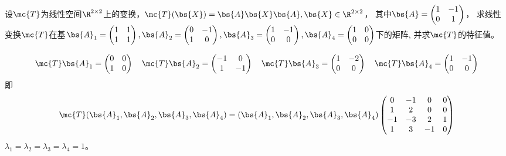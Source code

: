 \documentclass[12pt, a4paper, oneside, UTF8]{ctexbook}
\begin{document}
\begin{question}
    设$\mc{T}$为线性空间$\R^{2\times 2}$上的变换，$\mc{T}(\bs{X})=\bs{A}\bs{X}\bs{A},\bs{X} \in \R^{2\times 2}$，
    其中$\bs{A}=\begin{pmatrix}
        1&-1\\
        0&1
    \end{pmatrix}$，
    求线性变换$\mc{T}$在基$\bs{A}_1=\begin{pmatrix}
            1&1\\
            1&1
        \end{pmatrix},\bs{A}_2=\begin{pmatrix}
            0&-1\\
            1&0
        \end{pmatrix},\bs{A}_3=\begin{pmatrix}
            1&-1\\
            0&0
        \end{pmatrix},\bs{A}_4=\begin{pmatrix}
            1&0\\
            0&0
        \end{pmatrix}$下的矩阵,
        并求$\mc{T}$的特征值。
\end{question}

\begin{solution}
    \begin{align*}
        \mc{T}\bs{A}_1=\begin{pmatrix}
            0&0\\
            1&0
        \end{pmatrix} \quad
        \mc{T}\bs{A}_2=\begin{pmatrix}
            -1&0\\
            1&-1
        \end{pmatrix}\quad
        \mc{T}\bs{A}_3=\begin{pmatrix}
            1&-2\\
            0&0
        \end{pmatrix}\quad
        \mc{T}\bs{A}_4=\begin{pmatrix}
            1&-1\\
            0&0
        \end{pmatrix}
    \end{align*}
        即
        \begin{align*}
            \mc{T}(\bs{A}_1,\bs{A}_2,\bs{A}_3,\bs{A}_4)=
            (\bs{A}_1,\bs{A}_2,\bs{A}_3,\bs{A}_4)
            \begin{pmatrix}
                0& -1&0&0  \\
                1 & 2&0 &0 \\
                -1& -3& 2& 1\\
                1& 3& -1&0
            \end{pmatrix}
        \end{align*}
        $\lambda_1=\lambda_2=\lambda_3=\lambda_4=1$。
\end{solution}
\end{document}
